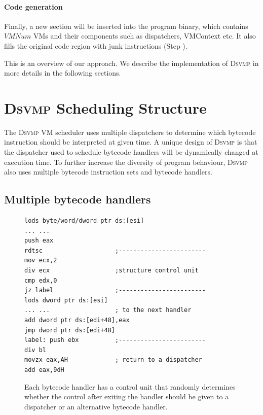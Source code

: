 \documentclass[times]{secauth}
\newcommand{\DSVMP}{\textsc{Dsvmp }}
\begin{document}
\paragraph*{Code generation}
Finally, a new section will be inserted into the program binary, which contains $VMNum$ VMs and their components such as dispatchers, VMContext etc. It also fills the original code region with junk instructions (Step ).

This is an overview of our approach. We describe the implementation of \DSVMP in more details in the following sections.

\section{\DSVMP Scheduling Structure \label{sec:dvs}}

The \DSVMP VM scheduler uses multiple dispatchers to determine which bytecode instruction should be interpreted at given time.
A unique design of \DSVMP is that the dispatcher used to schedule bytecode handlers will be dynamically changed at execution time. To further increase the diversity of program behaviour, \DSVMP also uses multiple bytecode instruction sets and bytecode handlers.

\subsection{Multiple bytecode handlers \label{sec:mb}}

\begin{figure}[t!]
\scriptsize
\begin{lstlisting}
lods byte/word/dword ptr ds:[esi]
... ...
push eax
rdtsc                    ;------------------------
mov ecx,2
div ecx                  ;structure control unit
cmp edx,0
jz label                 ;------------------------
lods dword ptr ds:[esi]
... ...                  ; to the next handler
add dword ptr ds:[edi+48],eax
jmp dword ptr ds:[edi+48]
label: push ebx          ;------------------------
div bl
movzx eax,AH             ; return to a dispatcher
add eax,9dH
\end{lstlisting}
\caption{Each bytecode handler has a control unit that randomly determines whether the control after exiting the handler should be given to a dispatcher or an alternative bytecode handler. }
\label{fig:newhandler}
\end{figure}
\end{document}
